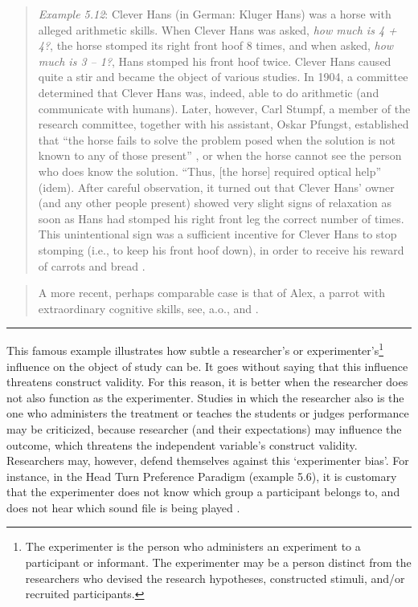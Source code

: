 \documentclass[
]{book}
\begin{document}
\begin{quote}
\emph{Example 5.12}: Clever Hans (in German: Kluger Hans) was a horse with alleged arithmetic skills. When Clever Hans was asked, \emph{how much is 4 + 4?}, the horse stomped its right front hoof 8 times, and when asked, \emph{how much is 3 -- 1?}, Hans stomped his front hoof twice. Clever Hans caused quite a stir and became the object of various studies. In 1904, a committee determined that Clever Hans was, indeed, able to do arithmetic (and communicate with humans). Later, however, Carl Stumpf, a member of the research committee, together with his assistant, Oskar Pfungst, established that ``the horse fails to solve the problem posed when the solution is not known to any of those present'' \citep[p.185, transl. AN]{Pfung07}, or when the horse cannot see the person who does know the solution. ``Thus, {[}the horse{]} required optical help'' (idem). After careful observation, it turned out that Clever Hans' owner (and any other people present) showed very slight signs of relaxation as soon as Hans had stomped his right front leg the correct number of times. This unintentional sign was a sufficient incentive for Clever Hans to stop stomping (i.e., to keep his front hoof down), in order to receive his reward of carrots and bread \citep{Pfung07} \citep[p.38--47]{Watz77}.
\end{quote}

\begin{quote}
A more recent, perhaps comparable case is that of Alex, a parrot with extraordinary cognitive skills, see, a.o., \citet{BLLB14} and \citet{Alex15}.
\end{quote}

\begin{center}\rule{0.5\linewidth}{0.5pt}\end{center}

This famous example illustrates how subtle a researcher's or experimenter's\footnote{The experimenter is the person who administers an experiment to a participant or informant. The experimenter may be a person distinct from the researchers who devised the research hypotheses, constructed stimuli, and/or recruited participants.} influence on the object of study can be. It goes without saying that this influence threatens construct validity. For this reason, it is better when the researcher does not also function as the experimenter. Studies in which the researcher also is the one who administers the treatment or teaches the students or judges performance may be criticized, because researcher (and their expectations) may influence the outcome, which threatens the independent variable's construct validity. Researchers may, however, defend themselves against this `experimenter bias'. For instance, in the Head Turn Preference Paradigm (example 5.6), it is customary that the experimenter does not know which group a participant belongs to, and does not hear which sound file is being played \citep[p.74]{John10}.
\end{document}

